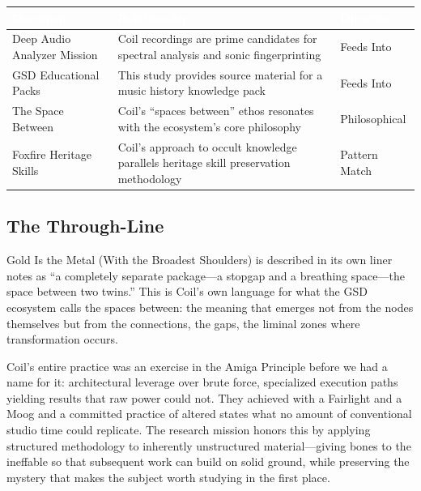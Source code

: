 \documentclass[11pt,letterpaper]{article}
\newcommand{\stageheader}[2]{%
  \noindent\colorbox{#2}{\makebox[\textwidth][l]{%
    \textcolor{white}{\bfseries\sffamily\hspace{6pt}#1\hspace{6pt}}}}%
  \vspace{0.5em}\par%
}
\newcommand{\tableheader}[1]{\textbf{\sffamily\textcolor{white}{#1}}}
\begin{document}
\begin{center}
\begin{tabularx}{\textwidth}{L{4cm}XC{2.5cm}}
\toprule
{}
\tableheader{Document} & \tableheader{Relationship} & \tableheader{Direction} \\
\midrule
Deep Audio Analyzer Mission & Coil recordings are prime candidates for spectral analysis and sonic fingerprinting & Feeds Into \\
GSD Educational Packs & This study provides source material for a music history knowledge pack & Feeds Into \\
The Space Between & Coil's ``spaces between'' ethos resonates with the ecosystem's core philosophy & Philosophical \\
Foxfire Heritage Skills & Coil's approach to occult knowledge parallels heritage skill preservation methodology & Pattern Match \\
\bottomrule
\end{tabularx}
\end{center}

\subsection{The Through-Line}

Gold Is the Metal (With the Broadest Shoulders) is described in its own liner notes as ``a completely separate package---a stopgap and a breathing space---the space between two twins.'' This is Coil's own language for what the GSD ecosystem calls the spaces between: the meaning that emerges not from the nodes themselves but from the connections, the gaps, the liminal zones where transformation occurs.

Coil's entire practice was an exercise in the Amiga Principle before we had a name for it: architectural leverage over brute force, specialized execution paths yielding results that raw power could not. They achieved with a Fairlight and a Moog and a committed practice of altered states what no amount of conventional studio time could replicate. The research mission honors this by applying structured methodology to inherently unstructured material---giving bones to the ineffable so that subsequent work can build on solid ground, while preserving the mystery that makes the subject worth studying in the first place.

\newpage

\stageheader{STAGE 2 --- RESEARCH REFERENCE}{secondary}
\end{document}
